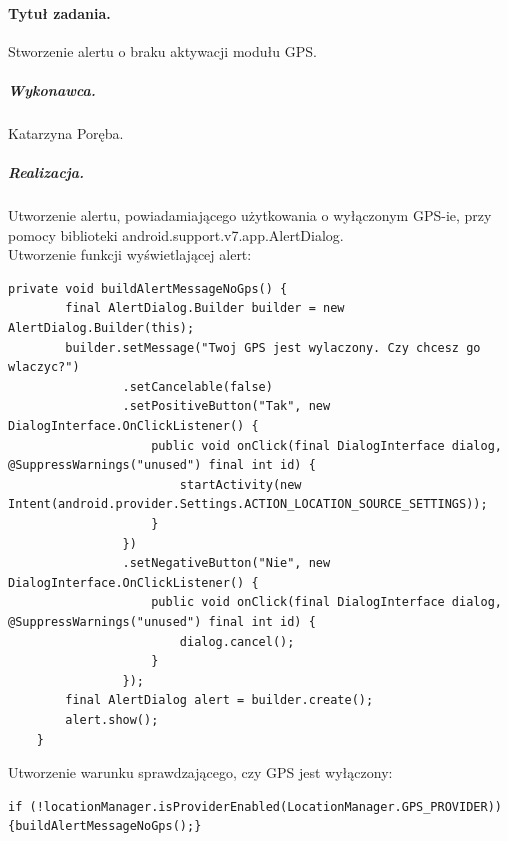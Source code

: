 \documentclass[a4paper]{article}
\begin{document}
\paragraph{Tytuł zadania.} Stworzenie alertu o braku aktywacji modułu GPS.
\subparagraph{Wykonawca.} Katarzyna Poręba.
\subparagraph{Realizacja.} Utworzenie alertu, powiadamiającego użytkowania o wyłączonym GPS-ie, przy pomocy biblioteki android.support.v7.app.AlertDialog. \\
Utworzenie funkcji wyświetlającej alert:
\begin{lstlisting}[style=java]
private void buildAlertMessageNoGps() {
        final AlertDialog.Builder builder = new AlertDialog.Builder(this);
        builder.setMessage("Twoj GPS jest wylaczony. Czy chcesz go wlaczyc?")
                .setCancelable(false)
                .setPositiveButton("Tak", new DialogInterface.OnClickListener() {
                    public void onClick(final DialogInterface dialog, @SuppressWarnings("unused") final int id) {
                        startActivity(new Intent(android.provider.Settings.ACTION_LOCATION_SOURCE_SETTINGS));
                    }
                })
                .setNegativeButton("Nie", new DialogInterface.OnClickListener() {
                    public void onClick(final DialogInterface dialog, @SuppressWarnings("unused") final int id) {
                        dialog.cancel();
                    }
                });
        final AlertDialog alert = builder.create();
        alert.show();
    }
\end{lstlisting}
Utworzenie warunku sprawdzającego, czy GPS jest wyłączony:
\begin{lstlisting}[style=java]
if (!locationManager.isProviderEnabled(LocationManager.GPS_PROVIDER)) {buildAlertMessageNoGps();}
\end{lstlisting}
\end{document}
